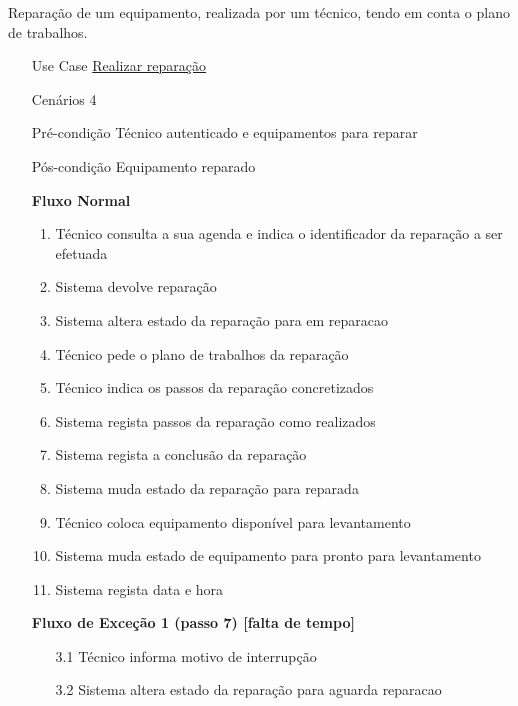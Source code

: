 \documentclass[../relatorio.tex]{subfiles}
\begin{document}
Reparação de um equipamento, realizada por um técnico, tendo em conta o plano de trabalhos.
\begin{itemize}
    \item[Use Case] {\underline{Realizar reparação}}
    \item[Cenários] {4}
    \item[Pré-condição] {Técnico autenticado e equipamentos para reparar}
    \item[Pós-condição] {Equipamento reparado}
          \begin{flushleft}
              \textbf{Fluxo Normal}
          \end{flushleft}
          \begin{enumerate}
              \item Técnico consulta a sua agenda e indica o identificador da reparação a ser efetuada
              \item Sistema devolve reparação
              \item Sistema altera estado da reparação para em reparacao
              \item Técnico pede o plano de trabalhos da reparação
              \item Técnico indica os passos da reparação concretizados
              \item Sistema regista passos da reparação como realizados
              \item Sistema regista a conclusão da reparação
              \item Sistema muda estado da reparação para reparada
              \item Técnico coloca equipamento disponível para levantamento
              \item Sistema muda estado de equipamento para pronto para levantamento
              \item Sistema regista data e hora
          \end{enumerate}
          \begin{flushleft}
              \textbf{Fluxo de Exceção 1 (passo 7) [falta de tempo]}
          \end{flushleft}
          \begin{itemize}
              \item[3.1]{Técnico informa motivo de interrupção}
              \item[3.2]{Sistema altera estado da reparação para aguarda reparacao}
          \end{itemize}
          \begin{flushleft}

\end{flushleft}
\end{itemize}
\end{document}
